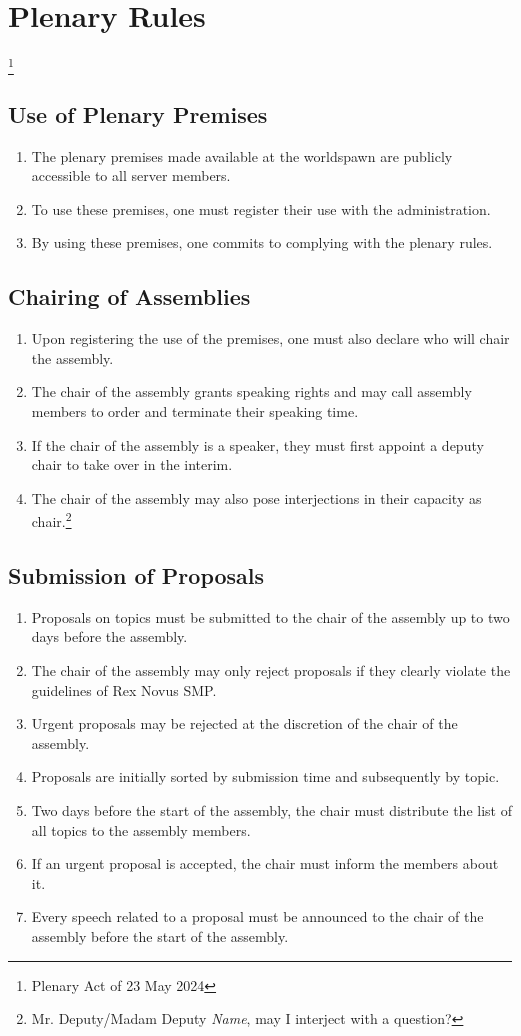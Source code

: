 \documentclass{article}
\begin{document}
\section{Plenary Rules}\footnote{Plenary Act of 23 May 2024}
\subsection{Use of Plenary Premises}
\begin{enumerate}[(1)]
	\item The plenary premises made available at the worldspawn are publicly accessible to all server members.
	\item To use these premises, one must register their use with the administration.
	\item By using these premises, one commits to complying with the plenary rules.
\end{enumerate}

\subsection{Chairing of Assemblies}
\begin{enumerate}[(1)]
	\item Upon registering the use of the premises, one must also declare who will chair the assembly.
	\item The chair of the assembly grants speaking rights and may call assembly members to order and terminate their speaking time.
	\item If the chair of the assembly is a speaker, they must first appoint a deputy chair to take over in the interim.
	\item The chair of the assembly may also pose interjections in their capacity as chair.\footnote{Mr. Deputy/Madam Deputy \textit{Name}, may I interject with a question?}
\end{enumerate}

\subsection{Submission of Proposals}
\begin{enumerate}[(1)]
	\item Proposals on topics must be submitted to the chair of the assembly up to two days before the assembly.
	\item The chair of the assembly may only reject proposals if they clearly violate the guidelines of Rex Novus SMP.
	\item Urgent proposals may be rejected at the discretion of the chair of the assembly.
	\item Proposals are initially sorted by submission time and subsequently by topic.
	\item Two days before the start of the assembly, the chair must distribute the list of all topics to the assembly members.
	\item If an urgent proposal is accepted, the chair must inform the members about it.
	\item Every speech related to a proposal must be announced to the chair of the assembly before the start of the assembly.
\end{enumerate}
\end{document}
